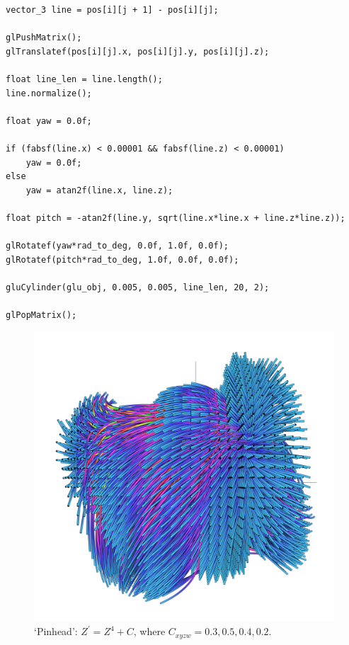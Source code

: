 \documentclass[12pt]{article}
\begin{document}
\begin{lstlisting}
vector_3 line = pos[i][j + 1] - pos[i][j];
			
glPushMatrix();
glTranslatef(pos[i][j].x, pos[i][j].y, pos[i][j].z);

float line_len = line.length();
line.normalize();
			
float yaw = 0.0f;

if (fabsf(line.x) < 0.00001 && fabsf(line.z) < 0.00001)
	yaw = 0.0f;
else
	yaw = atan2f(line.x, line.z);

float pitch = -atan2f(line.y, sqrt(line.x*line.x + line.z*line.z));

glRotatef(yaw*rad_to_deg, 0.0f, 1.0f, 0.0f);
glRotatef(pitch*rad_to_deg, 1.0f, 0.0f, 0.0f);

gluCylinder(glu_obj, 0.005, 0.005, line_len, 20, 2);

glPopMatrix();
\end{lstlisting}






\begin{figure} 
  \includegraphics[width=\textwidth]{3.png}	
  \caption{`Pinhead': $Z^{\prime} = Z^4 + C$, where $C_{xyzw} = 0.3, 0.5, 0.4, 0.2$.}
\end{figure}
\end{document}
